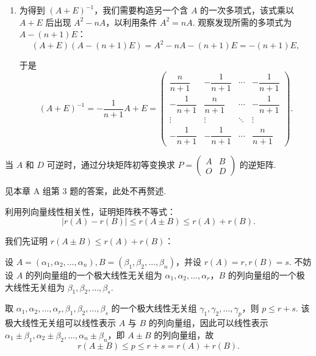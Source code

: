 \begin{exercise}
\begin{exgroup}
\begin{answer}
\begin{enumerate}
                \item 为得到 $(A+E)^{-1}$，我们需要构造另一个含 $A$ 的一次多项式，该式乘以 $A+E$ 后出现 $A^2 - nA$，以利用条件 $A^2 = nA$. 观察发现所需的多项式为 $A - (n+1)E$：
                    \[
                        (A+E)(A-(n+1)E) = A^2 - nA -(n+1)E = -(n+1)E,
                    \]

                    于是
                    \[
                        (A+E)^{-1} = -\frac{1}{n+1} A + E = \begin{pmatrix}
                            \dfrac{n}{n+1}  & -\dfrac{1}{n+1} & \cdots & -\dfrac{1}{n+1} \\[2em]
                            -\dfrac{1}{n+1} & \dfrac{n}{n+1}  & \cdots & -\dfrac{1}{n+1} \\[2em]
                            \vdots          & \vdots          & \ddots & \vdots          \\[2em]
                            -\dfrac{1}{n+1} & -\dfrac{1}{n+1} & \cdots & \dfrac{n}{n+1}
                        \end{pmatrix}.
                    \]
            \end{enumerate}
        \end{answer}

        \item 当 $A$ 和 $D$ 可逆时，通过分块矩阵初等变换求 $P=\begin{pmatrix}A & B \\ O & D\end{pmatrix}$ 的逆矩阵.
        \begin{answer}
            见本章 A 组第 3 题的答案，此处不再赘述.
        \end{answer}

        \item 利用列向量线性相关性，证明矩阵秩不等式：\[|r(A)-r(B)|\leqslant r(A\pm B) \leqslant r(A)+r(B).\]
        \begin{answer}
            我们先证明 $r(A \pm B) \leqslant r(A)+r(B)$：

            设 $A = (\alpha_1, \alpha_2, \ldots, \alpha_n), B = (\beta_1, \beta_2, \ldots, \beta_n)$，并设 $r(A) = r, r(B) = s$. 不妨设 $A$ 的列向量组的一个极大线性无关组为 $\alpha_1, \alpha_2, \ldots, \alpha_r$，$B$ 的列向量组的一个极大线性无关组为 $\beta_1, \beta_2, \ldots, \beta_s$.

            取 $\alpha_1, \alpha_2, \ldots, \alpha_r, \beta_1, \beta_2, \ldots, \beta_s$ 的一个极大线性无关组 $\gamma_1, \gamma_2, \ldots, \gamma_p$，则 $p \leqslant r+s$. 该极大线性无关组可以线性表示 $A$ 与 $B$ 的列向量组，因此可以线性表示 $\alpha_1 \pm \beta_1, \alpha_2 \pm \beta_2, \ldots, \alpha_n \pm \beta_n$，即 $A \pm B$ 的列向量组，故
            \[
                r(A \pm B) \leqslant p \leqslant r+s = r(A) + r(B).
            \]


\end{answer}
\end{exgroup}
\end{exercise}
